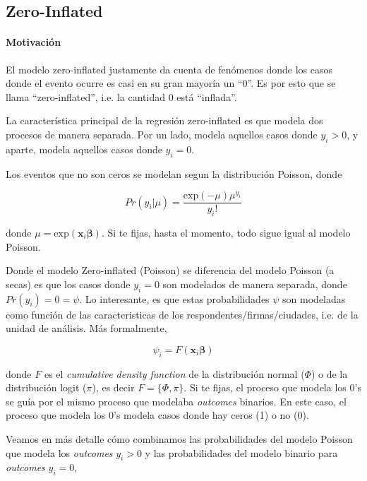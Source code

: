 \documentclass[onesided]{article}\usepackage[]{graphicx}\usepackage[]{color}
\begin{document}
\subsection{Zero-Inflated}

\paragraph{Motivaci\'on} El modelo zero-inflated justamente da cuenta de fen\'omenos donde los casos donde el evento ocurre es casi en su gran mayor\'ia un ``0''. Es por esto que se llama ``zero-inflated'', i.e. la cantidad 0 est\'a ``inflada''.

La caracter\'istica principal de la regresi\'on zero-inflated es que modela dos procesos de manera separada. Por un lado, modela aquellos casos donde $y_{i}>0$, y aparte, modela aquellos casos donde $y_{i}=0$. 

Los eventos que no son ceros se modelan segun la distribuci\'on Poisson, donde


\begin{equation}\label{poisson:d}
Pr(y_{i}|\mu) = \frac{\text{exp}(-\mu)\mu^{y_{i}}}{y_{i}!}
\end{equation}

donde $\mu=\text{exp}(\boldsymbol{x}_{i}\boldsymbol{\beta})$. Si te fijas, hasta el momento, todo sigue igual al modelo Poisson. 

Donde el modelo Zero-inflated (Poisson) se diferencia del modelo Poisson (a secas) es que los casos donde $y_{i}=0$ son modelados de manera separada, donde $Pr(y_{i})=0=\psi$. Lo interesante, es que estas probabilidades $\psi$ son modeladas como funci\'on de las caracteristicas de los respondentes/firmas/ciudades, i.e. de la unidad de an\'alisis. M\'as formalmente,


\begin{equation}\label{psi:p}
\psi_{i} = F(\boldsymbol{x}_{i}\boldsymbol{\beta})
\end{equation}

donde $F$ es el \emph{cumulative density function} de la distribuci\'on normal ($\Phi$) o de la distribuci\'on logit ($\pi$), es decir $F=\{\Phi, \pi\}$. Si te fijas, el proceso que modela los 0's se gu\'ia por el mismo proceso que modelaba \emph{outcomes} binarios. En este caso, el proceso que modela los 0's modela casos donde hay ceros (1) o no (0).

Veamos en m\'as detalle c\'omo combinamos las probabilidades del modelo Poisson que modela los \emph{outcomes} $y_{i}>0$ y las probabilidades del modelo binario para \emph{outcomes} $y_{i}=0$,
\end{document}
